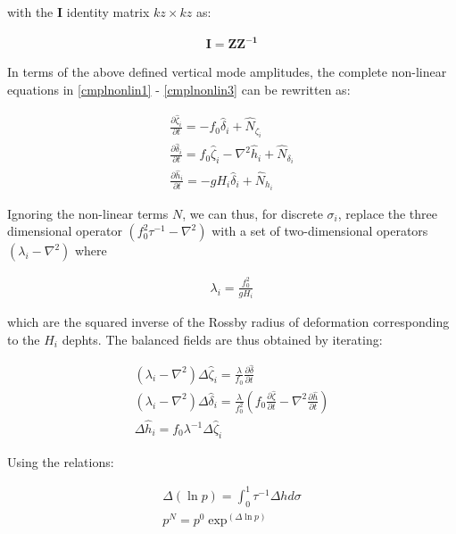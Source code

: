 with the $\bm{I}$ identity matrix $kz\times kz$ as:

\begin{gather}
  \bm{I} = \bm{Z}\bm{Z^{-1}}
\end{gather}

In terms of the above defined vertical mode amplitudes, the complete
non-linear equations in \ref{cmplnonlin1} - \ref{cmplnonlin3} can be
rewritten as:

\begin{gather}
  \frac{\partial \hat{\zeta}_i}{\partial t} = - f_0 \hat{\delta}_i +
     \hat{N}_{\zeta_i} \\
  \frac{\partial \hat{\delta}_i}{\partial t} = f_0 \hat{\zeta}_i -
     \nabla^2 \hat{h}_i + \hat{N}_{\delta_i} \\
  \frac{\partial \hat{h}_i}{\partial t} = -g H_i \hat{\delta}_i +
     \hat{N}_{h_i}
\end{gather}

Ignoring the non-linear terms $N$, we can thus, for discrete $\sigma_i$,
replace the three dimensional operator $(f_0^2\tau^{-1} - \nabla^2)$ with
a set of two-dimensional operators $(\lambda_i - \nabla^2)$ where

\begin{gather}
  \lambda_i = \frac{f_0^2}{gH_i}
\end{gather}

which are the squared inverse of the Rossby radius of deformation
corresponding to the $H_i$ dephts.
The balanced fields are thus obtained by iterating:

\begin{gather}
  \label{to_be_iterated1}
  \left( \lambda_i - \nabla^2 \right) \Delta \hat{\zeta}_i =
     \frac{\lambda}{f_0} \frac{\partial \hat{\delta}}{\partial t} \\
  \label{to_be_iterated2}
  \left( \lambda_i - \nabla^2 \right) \Delta \hat{\delta}_i =
     \frac{\lambda}{f_0^2} \left( f_0 
     \frac{\partial \hat{\zeta}}{\partial t} -
     \nabla^2 \frac{\partial \hat{h}}{\partial t} \right) \\
  \label{to_be_iterated3}
  \Delta \hat{h}_i = f_0 \lambda^{-1} \Delta \hat{\zeta}_i
\end{gather}

Using the relations:

\begin{gather}
  \Delta \left( \ln p\right) = \int_0^1 \tau^{-1} \Delta h d\sigma \\
  p^N = p^0 \exp^{\left( \Delta \ln p \right)}
\end{gather}

